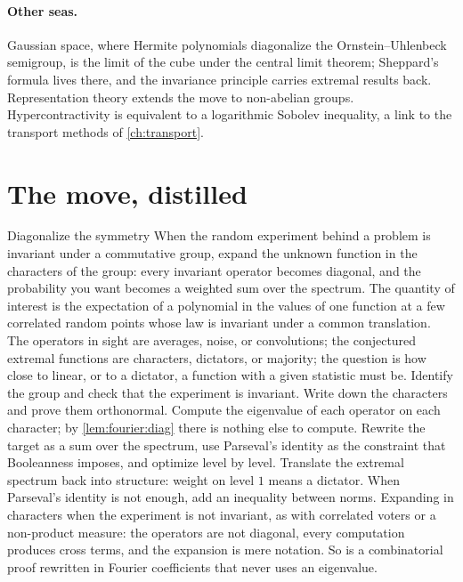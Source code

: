 \begin{refsection}
\paragraph{Other seas.}
Gaussian space, where Hermite polynomials diagonalize the Ornstein--Uhlenbeck semigroup, is the limit of the cube under the central limit theorem; Sheppard's formula lives there, and the invariance principle carries extremal results back. Representation theory extends the move to non-abelian groups. Hypercontractivity is equivalent to a logarithmic Sobolev inequality, a link to the transport methods of \cref{ch:transport}.

\section{The move, distilled}\label{sec:fourier:distilled}

\begin{move}{Diagonalize the symmetry}
 When the random experiment behind a problem is invariant under a commutative group, expand the unknown function in the characters of the group: every invariant operator becomes diagonal, and the probability you want becomes a weighted sum over the spectrum.
 The quantity of interest is the expectation of a polynomial in the values of one function at a few correlated random points whose law is invariant under a common translation. The operators in sight are averages, noise, or convolutions; the conjectured extremal functions are characters, dictators, or majority; the question is how close to linear, or to a dictator, a function with a given statistic must be.
 Identify the group and check that the experiment is invariant. Write down the characters and prove them orthonormal. Compute the eigenvalue of each operator on each character; by \cref{lem:fourier:diag} there is nothing else to compute. Rewrite the target as a sum over the spectrum, use Parseval's identity as the constraint that Booleanness imposes, and optimize level by level. Translate the extremal spectrum back into structure: weight on level $1$ means a dictator. When Parseval's identity is not enough, add an inequality between norms.
 Expanding in characters when the experiment is not invariant, as with correlated voters or a non-product measure: the operators are not diagonal, every computation produces cross terms, and the expansion is mere notation. So is a combinatorial proof rewritten in Fourier coefficients that never uses an eigenvalue.
\end{move}


\end{refsection}
